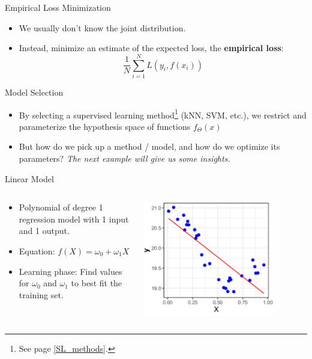 \begin{frame}{Empirical Loss Minimization}
  \begin{itemize}
    \item We usually don't know the joint distribution.
    \item Instead, minimize an estimate of the expected loss, the \textbf{empirical loss}:
      \[ \frac{1}{N} \sum_{i=1}^{N} L(y_i, f(x_i)) \]
  \end{itemize}
\end{frame}

\begin{frame}{Model Selection}
  \begin{itemize}
    \item By selecting a supervised learning method\footnote{See page \ref{SL_methods}.} (kNN, SVM, etc.), we restrict and parameterize the hypothesis space of functions $f_\Theta(x)$
    \item But how do we pick up a method / model, and how do we optimize its parameters? \textit{The next example will give us some insights.}
  \end{itemize}
\end{frame}


\begin{frame}{Linear Model}
  \begin{columns}
    \begin{column}{0.5\textwidth}
      \begin{itemize}
        \item Polynomial of degree 1 regression model with 1 input and 1 output.
        \item Equation: $f(X) = \omega_0 + \omega_1 X$ 
        \item Learning phase: Find values for $\omega_0$ and $\omega_1$ to best fit the training set. 
      \end{itemize}
    \end{column}
    \begin{column}{0.5\textwidth}
      \includegraphics[width=0.8\textwidth]{images/lm.png}
    \end{column}
  \end{columns}
\end{frame}

